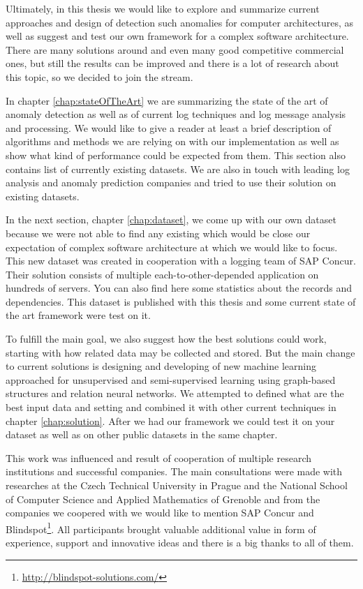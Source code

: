 Ultimately, in this thesis we would like to explore and summarize current approaches and design of detection such anomalies for computer architectures, as well as suggest and test our own framework for a complex software architecture. There are many solutions around and even many good competitive commercial ones, but still the results can be improved and there is a lot of research about this topic, so we decided to join the stream.

In chapter \ref{chap:stateOfTheArt} we are summarizing the state of the art of anomaly detection as well as of current log techniques and log message analysis and processing. We would like to give a reader at least a brief description of algorithms and methods we are relying on with our implementation as well as show what kind of performance could be expected from them. This section also contains list of currently existing datasets. We are also in touch with leading log analysis and anomaly prediction companies and tried to use their solution on existing datasets.

In the next section, chapter \ref{chap:dataset}, we come up with our own dataset because we were not able to find any existing which would be close our expectation of complex software architecture at which we would like to focus. This new dataset was created in cooperation with a logging team of SAP Concur. Their solution consists of multiple each-to-other-depended application on hundreds of servers. You can also find here some statistics about the records and dependencies. This dataset is published with this thesis and some current state of the art framework were test on it.

To fulfill the main goal, we also suggest how the best solutions could work, starting with how related data may be collected and stored. But the main change to current solutions is designing and developing of new machine learning approached for unsupervised and semi-supervised learning using graph-based structures and relation neural networks. We attempted to defined what are the best input data and setting and combined it with other current techniques in chapter \ref{chap:solution}. After we had our framework we could test it on your dataset as well as on other public datasets in the same chapter.

This work was influenced and result of cooperation of multiple research institutions and successful companies. The main consultations were made with researches at the Czech Technical University in Prague and the National School of Computer Science and Applied Mathematics of Grenoble and from the companies we coopered with we would like to mention SAP Concur and Blindspot\footnote{\url{http://blindspot-solutions.com/}}. All participants brought valuable additional value in form of experience, support and innovative ideas and there is a big thanks to all of them.  
